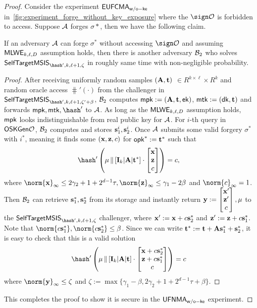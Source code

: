 \begin{proof}
Consider the experiment $\mathsf{EUFCMA}_\mathsf{w/o-ke}$ in~\cref{fig:experiment_forge_without_key_exposure} where the $\sign\Oc$ is forbidden to access. Suppose $\mathcal{A}$ forges $\sigma*$, then we have the following claim.  

\begin{claim}
If an adversary $\mathcal{A}$ can forge $\sigma^*$ without accessing $\sign\Oc$ and assuming $\mathsf{MLWE}_{k,\ell,D}$ assumption holds, then there is another adversary $\mathcal{B}_2$ who solves $\selfmsis_{\hash',k,\ell+1,\zeta}$ in roughly same time with non-negligible probability.
\end{claim}
\begin{proof}
After receiving uniformly random samples $(\mathbf{A},\mathbf{t})$ $\in R^{k\times\ell}\times R^{k}$ and random oracle access $\hash'(\cdot)$ from the challenger in $\selfmsis_{\hash',k,\ell+1,\zeta'+\beta}$, $\mathcal{B}_2$ computes $\mathsf{mpk}:=(\mathbf{A},\mathbf{t},\mathsf{ek})$, $\mathsf{mtk}:=(\mathsf{dk},\mathbf{t})$ and forwards $\mpk,\mtk,\hash'$ to $\mathcal{A}$.  As long as the $\mathsf{MLWE}_{k,\ell,D}$ assumption holds, $\mathsf{mpk}$ looks indistinguishable from real public key for $\mathcal{A}$. For $i$-th query in $\mathsf{OSKGen}\mathcal{O}$, $\mathcal{B}_2$ computes and stores $\mathbf{s}^i_1,\mathbf{s}^i_2$.
Once $\mathcal{A}$ submits some valid forgery $\sigma^*$ with $i^*$, meaning it finds some $(\mathbf{x},\mathbf{z},c)$ for $\mathsf{opk}^*:=\mathbf{t}^*$  such that 
$$\hash'\left( \mu\, \Vert\, [\In_k | \An | \tn^*]\cdot \begin{bmatrix}\xn\\ \zn\\ c\end{bmatrix}\right)=c, $$
where $\norm{\xn}_\infty\le 2\gamma_2+1+2^{d-1}\tau, \norm{\zn}_\infty \le\gamma_1-2\beta$ and $\norm{c}_\infty = 1$\cite{NISTPQC-R3:CRYSTALS-DILITHIUM20}.
Then $\mathcal{B}_2$ can retrieve $\mathbf{s}_1^*,\mathbf{s}_2^*$ from its storage and instantly return
$\mathbf{y}:=\begin{bmatrix}\mathbf{x}'\\ \mathbf{z}'\\ c \end{bmatrix}, \mu$ to the $\selfmsis_{\hash',k,\ell+1,\zeta}$ challenger, where $\mathbf{x}':= \mathbf{x}+c\mathbf{s}_2^*$ and  $\mathbf{z}':=\mathbf{z}+c\mathbf{s}_1^*$. 
Note that $\norm{c\sn_1^*},\norm{c\sn_2^*}\le\beta$. Since we can write $\mathbf{t}^*:=\mathbf{t}+\mathbf{A}\mathbf{s}_1^*+\mathbf{s}_2^*$, it is easy to check that this is a valid solution
$$\hash'\left( \mu\, \Vert\, [\In_k | \An | \tn]\cdot\begin{bmatrix}\xn+c\sn_2^*\\ \zn+c\sn_1^*\\ c \end{bmatrix}\right)=c
$$
where $\norm{\yn}_\infty\le \zeta$ and $\zeta:=\max\{\gamma_1-\beta, 2\gamma_2+1+2^{d-1}\tau+\beta\}$.
\end{proof}


This completes the proof to show it is secure in the $\mathsf{UFNMA}_\mathsf{w/o-ke}$ experiment.
\end{proof}

